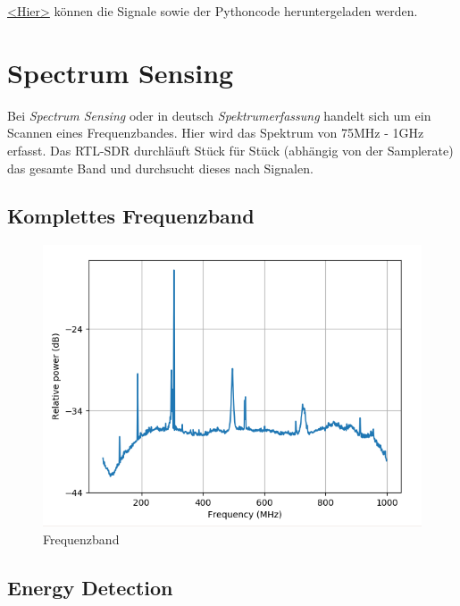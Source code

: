 \documentclass[12pt,a4paper]{article}
\begin{document}
\href{https://mega.nz/file/WlpFUDCI#UwWxYXxkRgZ9H_AYNt0trYvE5ey_xcw59lDZif9uqtI}
{<Hier>} können die Signale sowie der Pythoncode heruntergeladen werden.


\newpage
\section{Spectrum Sensing}
Bei \textit{Spectrum Sensing} oder in deutsch \textit{Spektrumerfassung} handelt sich um ein Scannen eines Frequenzbandes. Hier wird das Spektrum von 75MHz - 1GHz erfasst. Das RTL-SDR durchläuft Stück für Stück (abhängig von der Samplerate) das gesamte Band und durchsucht dieses nach Signalen.

 
\subsection*{Komplettes Frequenzband}

\begin{figure}[hbt!]
	\centering
		\includegraphics[width=1\textwidth ]
		{Bilder/A3_full_frequency_band.png}
		\caption{Frequenzband}
\end{figure}



\subsection*{Energy Detection}
\end{document}
